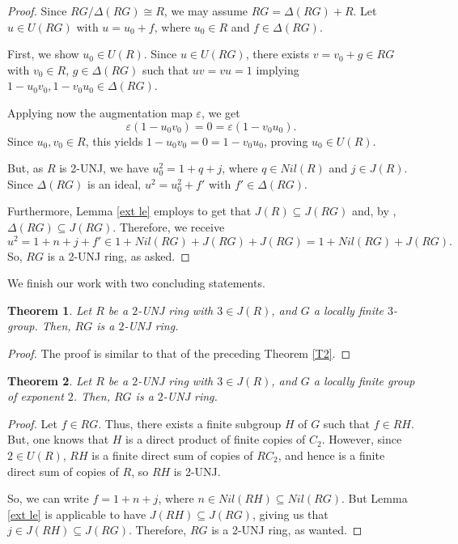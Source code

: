 \documentclass[12pt]{amsart}
\newtheorem{theorem}{Theorem}[section]
\theoremstyle{definition}
\begin{document}
\begin{proof}
Since $RG/\Delta(RG) \cong R$, we may assume $RG = \Delta(RG) + R$. Let $u \in U(RG)$ with $u = u_0 + f$, where $u_0 \in R$ and $f \in \Delta(RG)$.

First, we show $u_0 \in U(R)$. Since $u \in U(RG)$, there exists $v = v_0 + g \in RG$ with $v_0 \in R$, $g \in \Delta(RG)$ such that $uv = vu = 1$ implying $1 - u_0v_0, 1 - v_0u_0 \in \Delta(RG)$.

Applying now the augmentation map $\varepsilon$, we get $$\varepsilon(1 - u_0v_0) = 0 = \varepsilon(1 - v_0u_0).$$ Since $u_0, v_0 \in R$, this yields $1 - u_0v_0 = 0 = 1 - v_0u_0$, proving $u_0 \in U(R)$.

But, as $R$ is 2-UNJ, we have $u_0^2 = 1 + q + j$, where $q \in Nil(R)$ and $j \in J(R)$. Since $\Delta(RG)$ is an ideal, $u^2 = u_0^2 + f'$ with $f' \in \Delta(RG)$.

Furthermore, Lemma \ref{ext le} employs to get that $J(R) \subseteq J(RG)$ and, by \cite[Lemma 2]{zhouc}, $\Delta(RG) \subseteq J(RG)$. Therefore, we receive
\[
u^2 = 1 + n + j + f' \in 1 + Nil(RG) + J(RG) + J(RG) = 1 + Nil(RG) + J(RG).
\]
So, $RG$ is a 2-UNJ ring, as asked.
\end{proof}

We finish our work with two concluding statements.

\begin{theorem}
Let $R$ be a $2$-UNJ ring with $3 \in J(R)$, and $G$ a locally finite $3$-group. Then, $RG$ is a $2$-UNJ ring.
\end{theorem}

\begin{proof}
The proof is similar to that of the preceding Theorem \ref{T2}.
\end{proof}

\begin{theorem}
Let $R$ be a $2$-UNJ ring with $3 \in J(R)$, and $G$ a locally finite group of exponent $2$. Then, $RG$ is a $2$-UNJ ring.
\end{theorem}

\begin{proof}
Let $f \in RG$. Thus, there exists a finite subgroup $H$ of $G$ such that $f \in RH$. But, one knows that $H$ is a direct product of finite copies of $C_2$. However, since $2 \in U(R)$, $RH$ is a finite direct sum of copies of $RC_2$, and hence is a finite direct sum of copies of $R$, so $RH$ is 2-UNJ.

So, we can write $f = 1 + n + j$, where $n \in Nil(RH) \subseteq Nil(RG)$. But Lemma \ref{ext le} is applicable to have $J(RH) \subseteq J(RG)$, giving us that $j \in J(RH) \subseteq J(RG)$. Therefore, $RG$ is a 2-UNJ ring, as wanted.
\end{proof}
\end{document}
